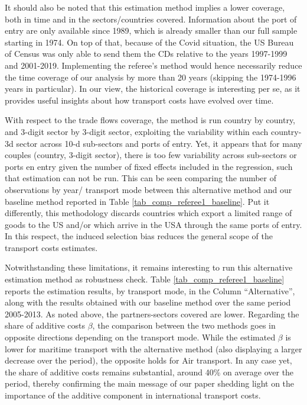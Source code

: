 \documentclass[11pt,twoside, authoryear]{elsarticle}
\begin{document}
It should also be noted that this estimation method implies a lower coverage, both in time and in the sectors/countries covered. Information about the port of entry are only available since 1989, which is already smaller than our full sample starting in 1974. On top of that, because of the Covid situation, the US Bureau of Census was only able to send them the CDs relative to the years 1997-1999 and 2001-2019. Implementing the referee's method would hence necessarily reduce the time coverage of our analysis by more than 20 years (skipping the 1974-1996 years in particular). In our view, the historical coverage is interesting per se, as it provides useful insights about how transport costs have evolved over time.

With respect to the trade flows coverage, the method is run country by country, and 3-digit sector by 3-digit sector, exploiting the variability within each country-3d sector across 10-d sub-sectors and ports of entry. Yet, it appears that for many couples (country, 3-digit sector), there is too few variability across sub-sectors or ports en entry given the number of fixed effects included in the regression, such that estimation can not be run. This can be seen comparing the number of observations by year/ transport mode between this alternative method and our baseline method reported in Table \ref{tab_comp_referee1_baseline}. Put it differently, this methodology discards countries which export a limited range of goods to the US and/or which arrive in the USA through the same ports of entry. In this respect, the induced selection bias reduces the general scope of the transport costs estimates.

Notwithstanding these limitations, it remains interesting to run this alternative estimation method as robustness check. Table \ref{tab_comp_referee1_baseline} reports the estimation results, by transport mode, in the Column ``Alternative'', along with the results obtained with our baseline method over the same period 2005-2013. As noted above, the partners-sectors covered are lower. Regarding the share of additive costs $\beta$, the comparison between the two methods goes in opposite directions depending on the transport mode. While the estimated $\beta$ is lower for maritime transport with the alternative method (also displaying a larger decrease over the period), the opposite holds for Air transport. In any case yet, the share of additive costs remains substantial, around 40\% on average over the period, thereby confirming the main message of our paper shedding light on the importance of the additive component in international transport costs.
\end{document}
